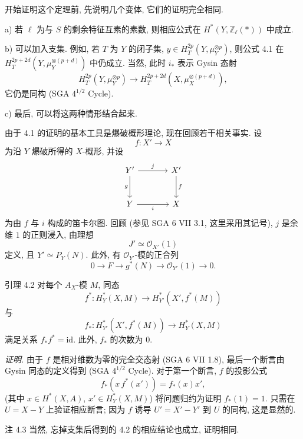 开始证明这个定理前, 先说明几个变体, 它们的证明完全相同.

a) 若 $\ell$ 为与 $S$ 的剩余特征互素的素数, 则相应公式在 $H^*(Y,\mathbb Z_\ell(*))$ 中成立.

b) 可以加入支集. 例如, 若 $T$ 为 $Y$ 的闭子集, $y\in\allowbreak  H_T^{2p}(Y,\mu_Y^{\otimes p})$, 则公式 4.1 在 $H_T^{2p+2d}(Y,\mu_Y^{\otimes(p+d)})$ 中仍成立. 当然, 此时 $i_*$ 表示 Gysin 态射
\[
H_T^{2p}(Y,\mu_Y^{\otimes p})
\to H_T^{2p+2d}(X,\mu_X^{\otimes(p+d)}),
\]
它仍是同构 (SGA $4^{1/2}$ Cycle).

c) 最后, 可以将这两种情形结合起来.

由于 4.1 的证明的基本工具是爆破概形理论, 现在回顾若干相关事实. 设
\[
f:X'\to X
\]
为沿 $Y$ 爆破所得的 $X$-概形, 并设
\[
\begin{tikzcd}[column sep=large,row sep=large]
Y' \arrow[r,"j"] \arrow[d,"g"'] & X' \arrow[d,"f"]\\
Y \arrow[r,"i"'] & X
\end{tikzcd}
\]
为由 $f$ 与 $i$ 构成的笛卡尔图. 回顾 (参见 SGA 6 VII 3.1, 这里采用其记号), $j$ 是余维 $1$ 的正则浸入, 由理想
\[
J'\simeq\mathcal O_{X'}(1)
\]
定义, 且 $Y'\simeq P_Y(N)$. 此外, 有 $\mathcal O_{Y'}$-模的正合列
\[
0\to F\to g^*(N)\to \mathcal O_{Y'}(1)\to0.
\]

\begin{statement}{引理 4.2}
对每个 $A_X$-模 $M$, 同态
\[
f^*:H_Y^*(X,M)\to H_{Y'}^*(X',f^*(M))
\]
与
\[
f_*:H_{Y'}^*(X',f^*(M))\to H_Y^*(X,M)
\]
满足关系 $f_*f^*=\mathrm{id}$. 此外, $f_*$ 的次数为 $0$.
\end{statement}

\emph{证明.} 由于 $f$ 是相对维数为零的完全交态射 (SGA 6 VII 1.8), 最后一个断言由 Gysin 同态的定义得到 (SGA $4^{1/2}$ Cycle). 对于第一个断言, $f$ 的投影公式
\[
f_*(x\,f^*(x'))=f_*(x)x',
\]
(其中 $x\in H^*(X,A)$, $x'\in H_Y^*(X,M)$) 将问题归约为证明 $f_*(1)=1$. 只需在 $U=X-Y$ 上验证相应断言; 因为 $f$ 诱导 $U'=X'-Y'$ 到 $U$ 的同构, 这是显然的.

\begin{statement}{注 4.3}
当然, 忘掉支集后得到的 4.2 的相应结论也成立, 证明相同.
\end{statement}

